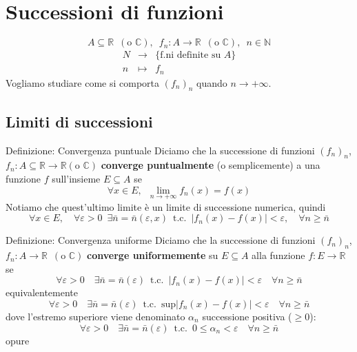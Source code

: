\documentclass[x11names]{article}
\newcommand{\definizione}[2]{
	\begin{center}
		\fboxsep11pt
		\colorbox{myblue}{\begin{minipage}{5.75in}
				\begin{blues}{Definizione: #1}
					#2
				\end{blues}
		\end{minipage}}
	\end{center}
}
\begin{document}
	

\tableofcontents
\newpage
	
	
\section{Successioni di funzioni}


\[ 
A \subseteq \mathbb{R} \;\ (\text{o } \mathbb{C}), \;\ f_{n}: A \to \mathbb{R} \;\ (\text{o } \mathbb{C}), \;\ n \in \mathbb{N} 
\]
\[ 
\begin{array}{ccl}
	N & \to & \{\text{f.ni definite su } A\} \\
	n & \mapsto & f_{n}
\end{array}
\]
Vogliamo studiare come si comporta \((f_{n})_{n}\) quando \(n\to +\infty\).

\subsection{Limiti di successioni}


\definizione{Convergenza puntuale}
{Diciamo che la successione di funzioni \((f_{n})_{n}\), \(f_{n}:A\subseteq \mathbb{R}\to \mathbb{R}  (\text{o } \mathbb{C})\) \textbf{converge puntualmente} (o semplicemente) a una funzione  \(f\) sull'insieme \(E \subseteq A\) se 
\[ 
\forall x \in E, \;\ \lim_{n\to + \infty}f_{n}(x) = f(x)
\]
Notiamo che quest'ultimo limite è un limite di successione numerica, quindi
\[ 
\forall x \in E, \quad  \forall \varepsilon > 0 \;\ \exists \bar{n} = \bar{n}(\varepsilon,x) \;\ \text{t.c.} \;\ |f_{n}(x) - f(x)| < \varepsilon, \quad \forall n \geq \bar{n}
\]}

\definizione{Convergenza uniforme}{Diciamo che la successione di funzioni \((f_{n})_{n}\), \(f_{n}:A\to \mathbb{R}  \;\ (\text{o } \mathbb{C})\) \textbf{converge uniformemente} su \(E \subseteq A\) alla funzione \(f:E\to \mathbb{R}\) se
\[ 
\forall \varepsilon > 0 \quad \exists \bar{n} = \bar{n}(\varepsilon) \;\ \text{t.c.} \;\ |f_{n}(x) - f(x)| < \varepsilon \quad \forall n \geq \bar{n}
\]
equivalentemente
\[ 
\forall \varepsilon > 0 \quad \exists \bar{n} = \bar{n}(\varepsilon) \;\ \text{t.c.} \;\ \text{sup}|f_{n}(x) - f(x)| < \varepsilon \quad \forall n \geq \bar{n}
\]
dove l'estremo superiore viene denominato \(\alpha_n\) successione positiva (\(\geq 0\)):
\[ 
\forall \varepsilon > 0 \quad \exists \bar{n} = \bar{n}(\varepsilon) \;\ \text{t.c.} \;\ 0 \leq \alpha_n < \varepsilon \quad \forall n \geq \bar{n}
\]
opure
\[ 
\
\]
} 
\end{document}
